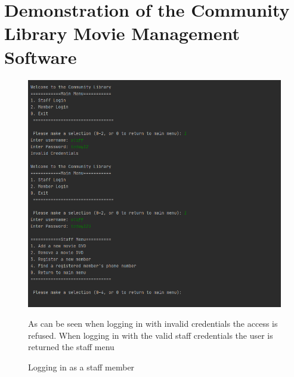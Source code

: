 \documentclass[a4paper,12pt]{article}
\begin{document}
\newpage

\section{Demonstration of the Community Library Movie Management Software}

\begin{figure}[!htb]
\centering
\includegraphics[width=1\textwidth]{1}
\caption{Logging in as a staff member}
\medskip
\small
As can be seen when logging in with invalid credentials the access is refused. When logging in with the valid staff credentials the user is returned the staff menu
\end{figure}
\end{document}
